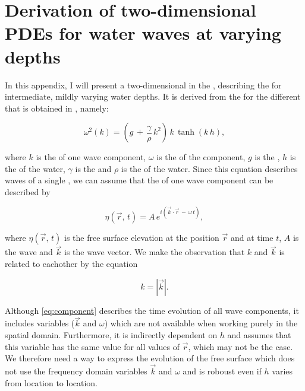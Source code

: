\chapter{Derivation of two-dimensional PDEs for water waves at varying depths}

In this appendix, I will present a two-dimensional  in the , describing the  for intermediate, mildly varying water depths. It is derived from the  for the different  that is obtained in , namely:

\begin{equation} \label{eq:dispersion}
\omega^2(k) = \left(g\,+\,\frac{\gamma}{\rho}\,k^2\right)\,k\,\tanh(k\,h),
\end{equation}

where $k$ is the  of one wave component, $\omega$ is the  of the component, $g$ is the , $h$ is the  of the water, $\gamma$ is the  and $\rho$ is the  of the water. Since this equation describes waves of a single , we can assume that the  of one wave component can be described by

\begin{equation} \label{eq:component}
\eta(\vec{r},\,t) = A\,e^{i(\vec{k}\cdot\vec{r}\,-\,\omega\,t)},
\end{equation}

where $\eta(\vec{r},\,t)$ is the free surface elevation at the position $\vec{r}$ and at time $t$, $A$ is the wave  and $\vec{k}$ is the wave vector. We make the observation that $k$ and $\vec{k}$ is related to eachother by the equation

\begin{equation} \label{eq:kvectok}
k = \left|\vec{k}\right|.
\end{equation}

Although \eqref{eq:component} describes the time evolution of all wave components, it includes  variables ($\vec{k}$ and $\omega$) which are not available when working purely in the spatial domain. Furthermore, it is indirectly dependent on $h$ and assumes that this variable has the same value for all values of $\vec{r}$, which may not be the case. We therefore need a way to express the evolution of the free surface which does not use the frequency domain variables $\vec{k}$ and $\omega$ and is roboust even if $h$ varies from location to location.

